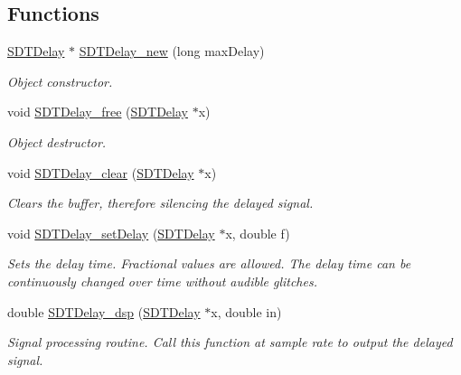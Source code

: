 \subsection*{Functions}
\begin{DoxyCompactItemize}
\item 
\hyperlink{group__delay_gad32f7855edcb8049b7666b2e27cfd6b5}{S\+D\+T\+Delay} $\ast$ \hyperlink{group__delay_ga2755a4639fdfd9928b54a0d97e113cfb}{S\+D\+T\+Delay\+\_\+new} (long max\+Delay)
\begin{DoxyCompactList}\small\item\em Object constructor. \end{DoxyCompactList}\item 
void \hyperlink{group__delay_ga29fa258d35a81249072073b5783459e7}{S\+D\+T\+Delay\+\_\+free} (\hyperlink{group__delay_gad32f7855edcb8049b7666b2e27cfd6b5}{S\+D\+T\+Delay} $\ast$x)
\begin{DoxyCompactList}\small\item\em Object destructor. \end{DoxyCompactList}\item 
\hypertarget{group__delay_ga2cfd25625ebed02f9cfce81ccee8b12f}{}void \hyperlink{group__delay_ga2cfd25625ebed02f9cfce81ccee8b12f}{S\+D\+T\+Delay\+\_\+clear} (\hyperlink{group__delay_gad32f7855edcb8049b7666b2e27cfd6b5}{S\+D\+T\+Delay} $\ast$x)\label{group__delay_ga2cfd25625ebed02f9cfce81ccee8b12f}

\begin{DoxyCompactList}\small\item\em Clears the buffer, therefore silencing the delayed signal. \end{DoxyCompactList}\item 
void \hyperlink{group__delay_gaab8ec12397cfa540a2b1b679f162d0b6}{S\+D\+T\+Delay\+\_\+set\+Delay} (\hyperlink{group__delay_gad32f7855edcb8049b7666b2e27cfd6b5}{S\+D\+T\+Delay} $\ast$x, double f)
\begin{DoxyCompactList}\small\item\em Sets the delay time. Fractional values are allowed. The delay time can be continuously changed over time without audible glitches. \end{DoxyCompactList}\item 
double \hyperlink{group__delay_ga955ae27c207ec6b8a0c90fc6029c8e2e}{S\+D\+T\+Delay\+\_\+dsp} (\hyperlink{group__delay_gad32f7855edcb8049b7666b2e27cfd6b5}{S\+D\+T\+Delay} $\ast$x, double in)
\begin{DoxyCompactList}\small\item\em Signal processing routine. Call this function at sample rate to output the delayed signal. \end{DoxyCompactList}\end{DoxyCompactItemize}



